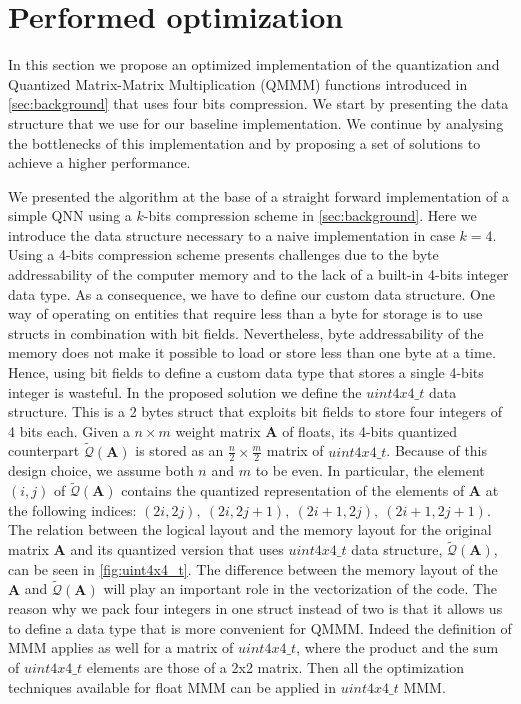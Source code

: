 \section{Performed optimization}\label{sec:yourmethod}
In this section we propose an optimized implementation of the quantization and Quantized Matrix-Matrix Multiplication (QMMM) functions introduced in \cref{sec:background} that uses four bits compression. We start by presenting the data structure that we use for our baseline implementation. We continue by analysing the bottlenecks of this implementation and by proposing a set of solutions to achieve a higher performance.

We presented the algorithm at the base of a straight forward implementation of a simple QNN using a $k$-bits compression scheme in \cref{sec:background}. Here we introduce the data structure necessary to a naive implementation in case $k=4$. Using a 4-bits compression scheme presents challenges due to the byte addressability of the computer memory and to the lack of a built-in 4-bits integer data type. As a consequence, we have to define our custom data structure. One way of operating on entities that require less than a byte for storage is to use structs in combination with bit fields. Nevertheless, byte addressability of the memory does not make it possible to load or store less than one byte at a time. Hence, using bit fields to define a custom data type that stores a single 4-bits integer is wasteful.  In the proposed solution we define the $uint4x4\_t$ data structure. This is a 2 bytes struct that exploits bit fields to store four integers of 4 bits each. Given a $n\times m$ weight matrix $\mathbf{A}$ of floats, its 4-bits quantized counterpart $\tilde{\mathcal{Q}}(\mathbf{A})$ is stored as an $\frac{n}{2}\times \frac{m}{2}$ matrix of $uint4x4\_t$. Because of this design choice, we assume both $n$ and $m$ to be even. In particular, the element $(i, j)$ of $\tilde{\mathcal{Q}}(\mathbf{A})$ contains the quantized representation of the elements of $\mathbf{A}$ at the following indices: $(2i, 2j),~(2i, 2j+1),~(2i+1, 2j),~(2i+1, 2j+1)$. The relation between the logical layout and the memory layout for the original matrix $\mathbf{A}$ and its quantized version that uses $uint4x4\_t$ data structure,   $\tilde{\mathcal{Q}}(\mathbf{A})$, can be seen in \cref{fig:uint4x4_t}. The difference between the memory layout of the $\mathbf{A}$ and $\tilde{\mathcal{Q}}(\mathbf{A})$ will play an important role in the vectorization of the code.
The reason why we pack four integers in one struct instead of two is that it allows us to define a data type that is more convenient for QMMM. Indeed the definition of MMM applies as well for a matrix of $uint4x4\_t$, where the product and the sum of $uint4x4\_t$ elements are those of a 2x2 matrix. Then all the optimization techniques available for float MMM can be applied in $uint4x4\_t$ MMM.


